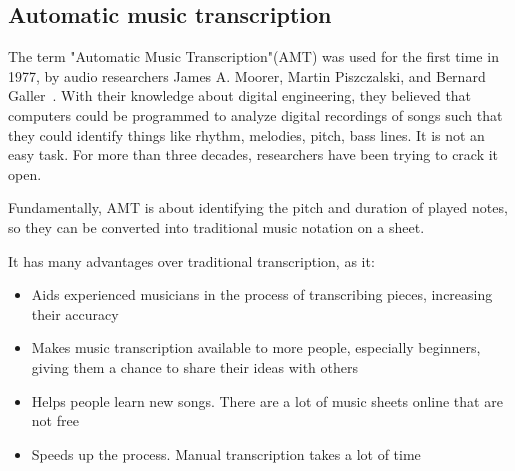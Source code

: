 \subsection{Automatic music transcription}
The term "Automatic Music Transcription"(AMT) was used for the first time in 1977, by audio researchers James A. Moorer, Martin Piszczalski, and Bernard Galler~\cite{transcription}. With their knowledge about digital engineering, they believed that computers could be programmed to analyze digital recordings of songs such that they could identify things like rhythm, melodies, pitch, bass lines. It is not an easy task. For more than three decades, researchers have been trying to crack it open. \par

Fundamentally, AMT is about identifying the pitch and duration of played notes, so they can be converted into traditional music notation on a sheet. \par

It has many advantages over traditional transcription, as it:
\begin{itemize}
	\item Aids experienced musicians in the process of transcribing pieces, increasing their accuracy
	\item Makes music transcription available to more people, especially beginners, giving them a chance to share their ideas with others
	\item Helps people learn new songs. There are a lot of music sheets online that are not free 
	\item Speeds up the process. Manual transcription takes a lot of time
\end{itemize}

